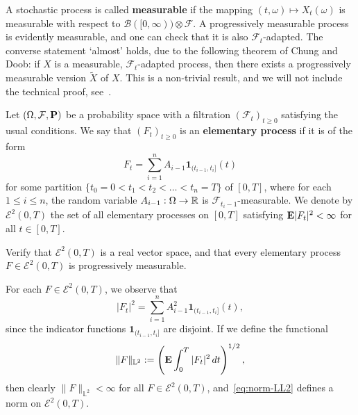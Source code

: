 \begin{remark}
\label{rmk:prog-meas}
A stochastic process is called \textbf{measurable} if the mapping $(t,\omega)\mapsto X_t(\omega)$ is measurable with respect to $\mathscr{B}([0,\infty))\otimes\mathcal{F}$. A progressively measurable process is evidently measurable, and one can check that it is also $\mathcal{F}_t$-adapted. The converse statement `almost' holds, due to the following theorem of Chung and Doob: if $X$ is a measurable, $\mathcal{F}_t$-adapted process, then there exists a progressively measurable version $\widetilde{X}$ of $X$. This is a non-trivial result, and we will not include the technical proof, see~\cite[Theorem T46, p.\ 68]{Mey}.
\end{remark}

\begin{definition}
Let $(\Omega,\mathcal{F},\mathbf{P})$ be a probability space with a filtration $(\mathcal{F}_{t})_{t \ge 0}$ satisfying the usual conditions. We say that $(F_t)_{t \ge 0}$ is an \textbf{elementary process} if it is of the form
\begin{equation*}
    F_t = \sum_{i=1}^n A_{i-1} \mathbf{1}_{(t_{i-1}, t_i]}(t)
\end{equation*}
for some partition $\{ t_0 = 0 < t_1 < t_2 < \ldots < t_n = T \}$ of $[0,T]$, where for each $1\le i\le n$, the random variable $A_{i-1}:\Omega\to\mathbb{R}$ is $\mathcal{F}_{t_i-1}$-measurable. We denote by $\mathcal{E}^2(0, T)$ the set of all elementary processes on $[0,T]$ satisfying $\mathbf{E}|F_t|^2 < \infty$ for all $t\in [0,T]$.
\end{definition}

\begin{exercise}
\label{exer:vector-space-elem-process}
    Verify that $\mathcal{E}^2(0,T)$ is a real vector space, and that every elementary process $F\in\mathcal{E}^2(0,T)$ is progressively measurable. 
\end{exercise}

For each $F\in\mathcal{E}^2(0,T)$, we observe that
\begin{equation*}
    |F_t|^2 = \sum_{i=1}^n A_{i-1}^2\mathbf{1}_{(t_{i-1},t_i]}(t),
\end{equation*}
since the indicator functions $\mathbf{1}_{(t_{i-1},t_i]}$ are disjoint. If we define the functional
\begin{equation}
\label{eq:norm-LL2}
    \|F\|_{\mathbb{L}^2} := \left( \mathbf{E} \int_0^T |F_t|^2 \,dt \right)^{1/2},
\end{equation}
then clearly $\|F\|_{\mathbb{L}^2} <\infty$ for all $F\in\mathcal{E}^2(0,T)$, and~\eqref{eq:norm-LL2} defines a norm on $\mathcal{E}^2(0,T)$.

